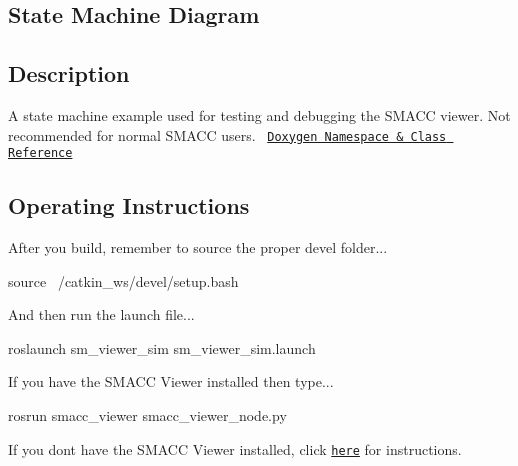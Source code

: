 \subsection*{State Machine Diagram}



\subsection*{Description}

A state machine example used for testing and debugging the S\+M\+A\+CC viewer. Not recommended for normal S\+M\+A\+CC users.~\newline
 \href{https://reelrbtx.github.io/SMACC_Documentation/master/html/namespacesm__viewer__sim.html}{\tt Doxygen Namespace \& Class Reference}

\subsection*{Operating Instructions}

After you build, remember to source the proper devel folder...


\begin{DoxyCode}
source ~/catkin\_ws/devel/setup.bash
\end{DoxyCode}


And then run the launch file...


\begin{DoxyCode}
roslaunch sm\_viewer\_sim sm\_viewer\_sim.launch
\end{DoxyCode}
 If you have the S\+M\+A\+CC Viewer installed then type...


\begin{DoxyCode}
rosrun smacc\_viewer smacc\_viewer\_node.py
\end{DoxyCode}


If you don\textquotesingle{}t have the S\+M\+A\+CC Viewer installed, click \href{http://smacc.ninja/smacc-viewer/}{\tt here} for instructions. 